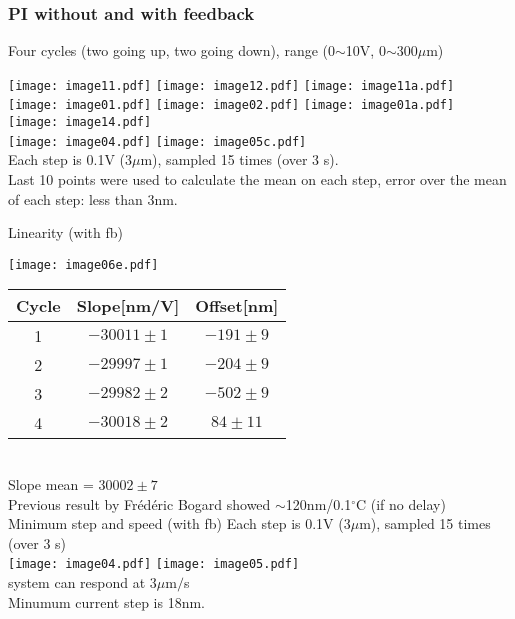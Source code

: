 \subsubsection{PI without and with feedback}
Four cycles (two going up, two going down),
range (0$\sim$10V, 0$\sim$300$\mu$m)\par
\texttt{[image: image11.pdf]}
\texttt{[image: image12.pdf]}
\texttt{[image: image11a.pdf]}\\
\texttt{[image: image01.pdf]}
\texttt{[image: image02.pdf]}
\texttt{[image: image01a.pdf]}\\
 \texttt{[image: image14.pdf]}\\
 \texttt{[image: image04.pdf]}
 \texttt{[image: image05c.pdf]}\\
 {\tiny Each step is 0.1V (3$\mu$m), sampled 15 times (over 3 s).}\\ 
{\tiny Last 10 points were used to calculate the mean on each step, error over the mean of each step: less than 3nm.}\par
Linearity (with fb)\par
\texttt{[image: image06e.pdf]}
\begin{tabular}[]{|c|c|c|}\hline
 Cycle & Slope[nm/V] & Offset[nm] \\\hline
 {\color{red}1} & $-30011 \pm 1$& $-191\pm9$\\
{\color{green}2} & $-29997 \pm 1$& $-204\pm9$ \\
{\color{blue}3} & $-29982 \pm 2$& $-502\pm9$\\
{\color{magenta}4} & $-30018 \pm2$ & $84\pm11$\\\hline
\end{tabular}\\Slope mean = $30002\pm7$\\Previous result by Frédéric Bogard showed $\sim$120nm/0.1$^\circ$C (if no delay)\\
 
Minimum step and speed (with fb)
Each step is 0.1V (3$\mu$m), sampled 15 times (over 3 s)\\
\texttt{[image: image04.pdf]}
\texttt{[image: image05.pdf]}\\
system can respond at 3$\mu$m$/$s\\
Minumum current step is 18nm.

